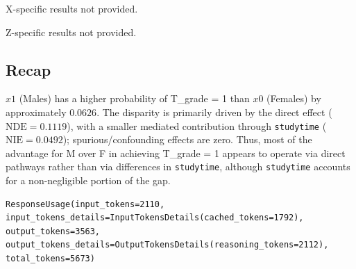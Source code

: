 \documentclass{article}
\begin{document}
X-specific results not provided.

Z-specific results not provided.

\subsection*{Recap}
$x1$ (Males) has a higher probability of T\_grade = 1 than $x0$ (Females) by approximately $0.0626$. The disparity is primarily driven by the direct effect ($\text{NDE} = 0.1119$), with a smaller mediated contribution through \texttt{studytime} ($\text{NIE} = 0.0492$); spurious/confounding effects are zero. Thus, most of the advantage for M over F in achieving T\_grade = 1 appears to operate via direct pathways rather than via differences in \texttt{studytime}, although \texttt{studytime} accounts for a non-negligible portion of the gap.


\begin{Verbatim}[breaklines=true]
ResponseUsage(input_tokens=2110, input_tokens_details=InputTokensDetails(cached_tokens=1792), output_tokens=3563, output_tokens_details=OutputTokensDetails(reasoning_tokens=2112), total_tokens=5673)
\end{Verbatim}
\end{document}

